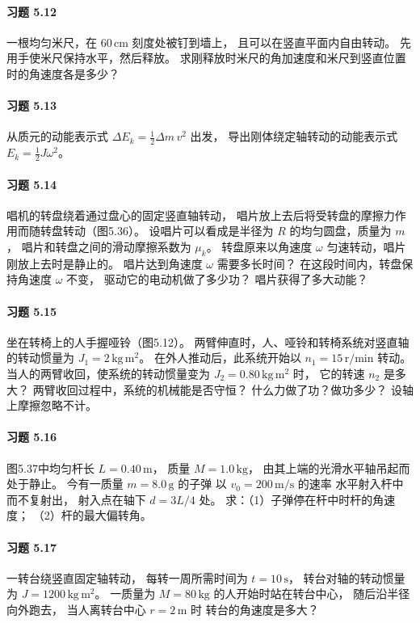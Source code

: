 \paragraph{习题 5.12}
一根均匀米尺，在 \(60\,\mathrm{cm}\) 刻度处被钉到墙上，
且可以在竖直平面内自由转动。
先用手使米尺保持水平，然后释放。
求刚释放时米尺的角加速度和米尺到竖直位置时的角速度各是多少？

\paragraph{习题 5.13}
从质元的动能表示式
\(\Delta E_k=\tfrac12\Delta m\,v^2\) 出发，
导出刚体绕定轴转动的动能表示式
\(E_k=\tfrac12J\omega^2\)。

\paragraph{习题 5.14}
唱机的转盘绕着通过盘心的固定竖直轴转动，
唱片放上去后将受转盘的摩擦力作用而随转盘转动（图5.36）。
设唱片可以看成是半径为 \(R\) 的均匀圆盘，质量为 \(m\)，
唱片和转盘之间的滑动摩擦系数为 \(\mu_k\)。
转盘原来以角速度 \(\omega\) 匀速转动，唱片刚放上去时是静止的。
唱片达到角速度 \(\omega\) 需要多长时间？
在这段时间内，转盘保持角速度 \(\omega\) 不变，
驱动它的电动机做了多少功？
唱片获得了多大动能？

\paragraph{习题 5.15}
坐在转椅上的人手握哑铃（图5.12）。
两臂伸直时，人、哑铃和转椅系统对竖直轴的转动惯量为
\(J_1=2\,\mathrm{kg\,m^2}\)。
在外人推动后，此系统开始以 \(n_1=15\,\mathrm{r/min}\) 转动。
当人的两臂收回，使系统的转动惯量变为
\(J_2=0.80\,\mathrm{kg\,m^2}\) 时，
它的转速 \(n_2\) 是多大？
两臂收回过程中，系统的机械能是否守恒？
什么力做了功？做功多少？
设轴上摩擦忽略不计。

\paragraph{习题 5.16}
图5.37中均匀杆长 \(L=0.40\,\mathrm m\)，
质量 \(M=1.0\,\mathrm{kg}\)，
由其上端的光滑水平轴吊起而处于静止。
今有一质量 \(m=8.0\,\mathrm g\) 的子弹
以 \(v_0=200\,\mathrm{m/s}\) 的速率
水平射入杆中而不复射出，
射入点在轴下 \(d=3L/4\) 处。
求：（1）子弹停在杆中时杆的角速度；
（2）杆的最大偏转角。

\paragraph{习题 5.17}
一转台绕竖直固定轴转动，
每转一周所需时间为 \(t=10\,\mathrm s\)，
转台对轴的转动惯量为 \(J=1200\,\mathrm{kg\,m^2}\)。
一质量为 \(M=80\,\mathrm{kg}\) 的人开始时站在转台中心，
随后沿半径向外跑去，
当人离转台中心 \(r=2\,\mathrm m\) 时
转台的角速度是多大？

